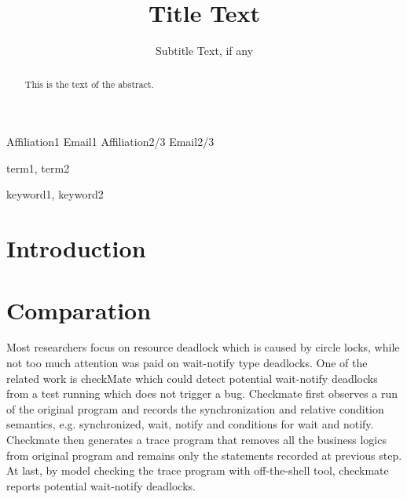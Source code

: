 \documentclass{sigplanconf}
\begin{document}
\setlength{\pdfpageheight}{\paperheight}
\setlength{\pdfpagewidth}{\paperwidth}






\title{Title Text}
\subtitle{Subtitle Text, if any}

           {Affiliation1}
           {Email1}
           {Affiliation2/3}
           {Email2/3}

\maketitle

\begin{abstract}
This is the text of the abstract.
\end{abstract}


\terms
term1, term2

\keywords
keyword1, keyword2

\section{Introduction}




\section{Comparation}

Most researchers focus on resource deadlock which is caused by circle locks, while not too much attention was paid on wait-notify type deadlocks. One of the related work is checkMate\cite{joshi2010effective} which could detect potential wait-notify deadlocks from a test running which does not trigger a bug. Checkmate first observes a run of the original program and records the synchronization and relative condition semantics, e.g. synchronized, wait, notify and conditions for wait and notify. Checkmate then generates a trace program that removes all the business logics from original program and remains only the statements recorded at previous step. At last, by model checking the trace program with off-the-shell tool, checkmate reports potential wait-notify deadlocks.
\end{document}
